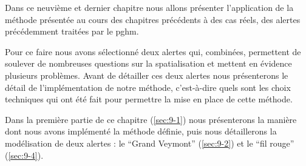 Dans ce neuvième et dernier chapitre nous allons présenter
l'application de la méthode présentée au cours des chapitres
précédents à des cas réels, des alertes précédemment traitées par le
\ac{pghm}.

Pour ce faire nous avons sélectionné deux alertes qui, combinées,
permettent de soulever de nombreuses questions sur la spatialisation
et mettent en évidence plusieurs problèmes. Avant de détailler ces
deux alertes nous présenterons le détail de l'implémentation de notre
méthode, c'est-à-dire quels sont les choix techniques qui ont été fait
pour permettre la mise en place de cette méthode.

Dans la première partie de ce chapitre (\autoref{sec:9-1}) nous
présenterons la manière dont nous avons implémenté la méthode définie,
puis nous détaillerons la modélisation de deux alertes : le
\enquote{Grand Veymont} (\autoref{sec:9-2}) et le \enquote{fil rouge}
(\autoref{sec:9-4}).


